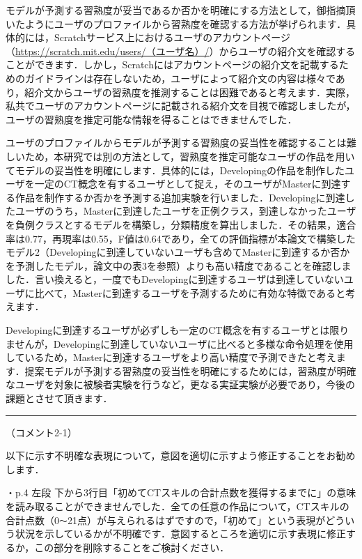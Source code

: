 \documentclass{jarticle} %
\def\subsection#1{ \vspace{1pc} {\gt #1} }
\def\nextans{ \vspace{2pc} \hrule }
\begin{document}
モデルが予測する習熟度が妥当であるか否かを明確にする方法として，御指摘頂いたようにユーザのプロファイルから習熟度を確認する方法が挙げられます．具体的には，Scratchサービス上におけるユーザのアカウントページ（\url{https://scratch.mit.edu/users/（ユーザ名）/}）からユーザの紹介文を確認することができます．しかし，Scratchにはアカウントページの紹介文を記載するためのガイドラインは存在しないため，ユーザによって紹介文の内容は様々であり，紹介文からユーザの習熟度を推測することは困難であると考えます．実際，私共でユーザのアカウントページに記載される紹介文を目視で確認しましたが，ユーザの習熟度を推定可能な情報を得ることはできませんでした．

ユーザのプロファイルからモデルが予測する習熟度の妥当性を確認することは難しいため，本研究では別の方法として，習熟度を推定可能なユーザの作品を用いてモデルの妥当性を明確にします．具体的には，Developingの作品を制作したユーザを一定のCT概念を有するユーザとして捉え，そのユーザがMasterに到達する作品を制作するか否かを予測する追加実験を行いました．Developingに到達したユーザのうち，Masterに到達したユーザを正例クラス，到達しなかったユーザを負例クラスとするモデルを構築し，分類精度を算出しました．その結果，適合率は0.77，再現率は0.55，F値は0.64であり，全ての評価指標が本論文で構築したモデル2（Developingに到達していないユーザも含めてMasterに到達するか否かを予測したモデル，論文中の表3を参照）よりも高い精度であることを確認しました．言い換えると，一度でもDevelopingに到達するユーザは到達していないユーザに比べて，Masterに到達するユーザを予測するために有効な特徴であると考えます．

Developingに到達するユーザが必ずしも一定のCT概念を有するユーザとは限りませんが，Developingに到達していないユーザに比べると多様な命令処理を使用しているため，Masterに到達するユーザをより高い精度で予測できたと考えます．提案モデルが予測する習熟度の妥当性を明確にするためには，習熟度が明確なユーザを対象に被験者実験を行うなど，更なる実証実験が必要であり，今後の課題とさせて頂きます．


\newpage
\nextans
\subsection{（コメント2-1）}

以下に示す不明確な表現について，意図を適切に示すよう修正することをお勧めします．

\vspace{0.2cm}
\noindent・p.4 左段 下から3行目「初めてCTスキルの合計点数を獲得するまでに」の意味を読み取ることができませんでした．全ての任意の作品について，CTスキルの合計点数（0\verb|〜|21点）が与えられるはずですので，「初めて」という表現がどういう状況を示しているかが不明確です．意図するところを適切に示す表現に修正するか，この部分を削除することをご検討ください．
\end{document}
